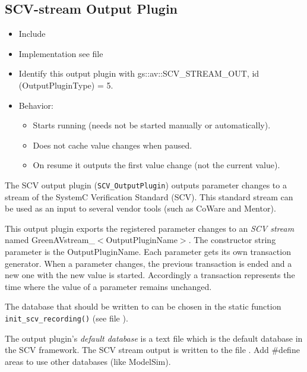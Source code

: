 \subsection{SCV-stream Output Plugin}
\label{GAVOPscv}

\begin{itemize}
  \item Include 
  \item Implementation see file 
  \item Identify this output plugin with {\sffamily gs::av::SCV\_STREAM\_OUT}, \newline
           id ({\sffamily OutputPluginType}) = 5.
  \item Behavior:
    \begin{itemize}
        \item Starts running (needs not be started manually or automatically).
        \item Does not cache value changes when paused.
        \item On resume it outputs the first value change (not the current value).
    \end{itemize}
\end{itemize}

The SCV output plugin (\lstinline|SCV_OutputPlugin|) outputs parameter changes to a stream of the SystemC Verification Standard (SCV). This standard stream can be used as an input to several vendor tools (such as CoWare and Mentor).

 This output plugin exports the registered
 parameter changes to an {\em SCV stream} named \mbox{\sffamily GreenAVstream\_$<$OutputPluginName$>$}. The constructor string parameter is the {\sffamily OutputPluginName}. Each
 parameter gets its own transaction generator. When a parameter changes, the previous
 transaction is ended and a new one with the new value is started. Accordingly a 
 transaction represents the time where the value of a parameter remains unchanged.

 The database that should be written to can be chosen in the static function 
 \lstinline|init_scv_recording()| (see file ).

The output plugin's {\em default database} is a text file which is the default database in the SCV framework. The SCV stream output is written to the file .  Add \#define areas to use other databases (like ModelSim).

